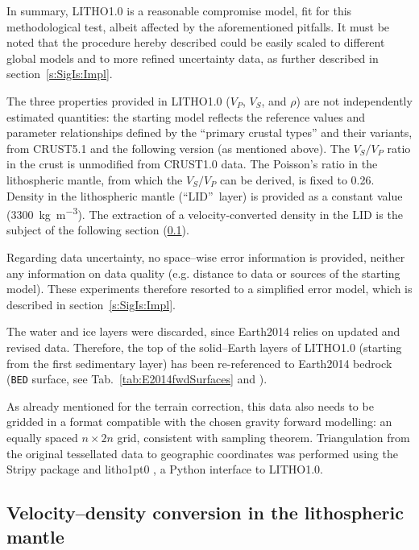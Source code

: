 In summary, {LITHO1.0} is a reasonable compromise model, fit for this methodological test, albeit affected by the aforementioned pitfalls.
It must be noted that the procedure hereby described could be easily scaled to different global models and to more refined uncertainty data, as further described in section~\ref{s:SigIs:Impl}.

The three properties provided in {LITHO1.0} ($V_P$, $V_S$, and $\rho$) are not independently estimated quantities: the starting model reflects the reference values and parameter relationships defined by the  ``primary crustal types'' and their variants, from {CRUST5.1} \parencite{Mooney1998_Crust51} and the following version (as mentioned above).
The $V_S/V_P$ ratio in the crust is unmodified from CRUST1.0 data.
The Poisson's ratio \parencite[see e.g.][]{Sheriff2002} in the lithospheric mantle, from which the $V_S/V_P$ can be derived, is fixed to \num{0.26}.
Density in the lithospheric mantle (``LID''~layer) is provided as a constant value (\SI{3300}{\kilo \gram \per \cubic \metre}).
The extraction of a velocity-converted density in the LID is the subject of the following section (\ref{ss:SigIs:InModels:SCLM}).

Regarding data uncertainty, no space--wise error information is provided, neither any information on data quality (e.g. distance to data or sources of the starting model).
These experiments therefore resorted to a simplified error model, which is described in section~\ref{s:SigIs:Impl}.

The water and ice layers were discarded, since {Earth2014} \parencite{Hirt2015} relies on updated and revised data.
Therefore, the top of the solid--Earth layers of {LITHO1.0} (starting from the first sedimentary layer) has been re-referenced to {Earth2014} bedrock (\texttt{BED} surface, see Tab.~\ref{tab:E2014fwdSurfaces} and \cite{Hirt2015_Earth2014readme}).

As already mentioned for the terrain correction, this data also needs to be gridded in a format compatible with the chosen gravity forward modelling: an equally spaced $n \times 2n$ grid, consistent with \textcite{Driscoll1994} sampling theorem.
Triangulation from the original tessellated data to geographic coordinates was performed using the {Stripy} package \parencites{Moresi2019}{Moresi2019_zenodo} and {litho1pt0} \parencite{Moresi2019_litho1pt0}, a Python interface to {LITHO1.0}.

\subsection{Velocity--density conversion in the lithospheric mantle}
\label{ss:SigIs:InModels:SCLM}

